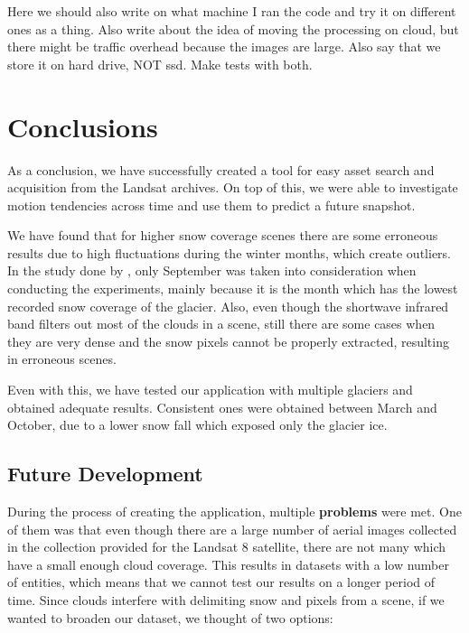 \documentclass[12pt, a4paper]{report}
\begin{document}
	\par Here we should also write on what machine I ran the code and try it on different ones as a thing. Also write about the idea of moving the processing on cloud, but there might be traffic overhead because the images are large. Also say that we store it on hard drive, NOT ssd. Make tests with both.
	
	\newpage{}	
	\chapter{Conclusions}
	\label{seq:conclusions}
	
	
	\par As a conclusion, we have successfully created a tool for easy asset search and acquisition from the Landsat archives. On top of this, we were able to investigate motion tendencies across time and use them to predict a future snapshot.
	
	\par We have found that for higher snow coverage scenes there are some erroneous results due to high fluctuations during the winter months, which create outliers. In the study done by \cite{parvati}, only September was taken into consideration when conducting the experiments, mainly because it is the month which has the lowest recorded snow coverage of the glacier. Also, even though the shortwave infrared band filters out most of the clouds in a scene, still there are some cases when they are very dense and the snow pixels cannot be properly extracted, resulting in erroneous scenes.
	
	\par Even with this, we have tested our application with multiple glaciers and obtained adequate results. Consistent ones were obtained between March and October, due to a lower snow fall which exposed only the glacier ice.
	
	\section{Future Development}
	\label{seq:future_development}
	
	\par During the process of creating the application, multiple \textbf{problems} were met. One of them was that even though there are a large number of aerial images collected in the collection provided for the Landsat 8 satellite, there are not many which have a small enough cloud coverage. This results in datasets with a low number of entities, which means that we cannot test our results on a longer period of time. Since clouds interfere with delimiting snow and pixels from a scene, if we wanted to broaden our dataset, we thought of two options:
	
\end{document}
